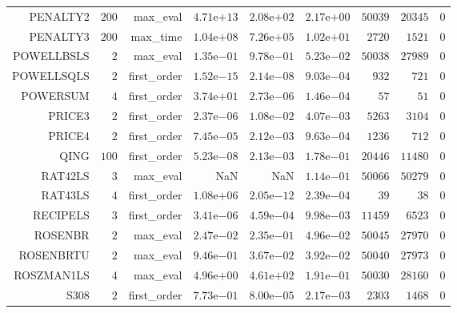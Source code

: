 \begin{longtable}{rrrrrrrrr}
PENALTY2 & \(   200\) & max\_eval & \( 4.71\)e\(+13\) & \( 2.08\)e\(+02\) & \( 2.17\)e\(+00\) & \( 50039\) & \( 20345\) & \(     0\) \\
PENALTY3 & \(   200\) & max\_time & \( 1.04\)e\(+08\) & \( 7.26\)e\(+05\) & \( 1.02\)e\(+01\) & \(  2720\) & \(  1521\) & \(     0\) \\
POWELLBSLS & \(     2\) & max\_eval & \( 1.35\)e\(-01\) & \( 9.78\)e\(-01\) & \( 5.23\)e\(-02\) & \( 50038\) & \( 27989\) & \(     0\) \\
POWELLSQLS & \(     2\) & first\_order & \( 1.52\)e\(-15\) & \( 2.14\)e\(-08\) & \( 9.03\)e\(-04\) & \(   932\) & \(   721\) & \(     0\) \\
POWERSUM & \(     4\) & first\_order & \( 3.74\)e\(+01\) & \( 2.73\)e\(-06\) & \( 1.46\)e\(-04\) & \(    57\) & \(    51\) & \(     0\) \\
PRICE3 & \(     2\) & first\_order & \( 2.37\)e\(-06\) & \( 1.08\)e\(-02\) & \( 4.07\)e\(-03\) & \(  5263\) & \(  3104\) & \(     0\) \\
PRICE4 & \(     2\) & first\_order & \( 7.45\)e\(-05\) & \( 2.12\)e\(-03\) & \( 9.63\)e\(-04\) & \(  1236\) & \(   712\) & \(     0\) \\
QING & \(   100\) & first\_order & \( 5.23\)e\(-08\) & \( 2.13\)e\(-03\) & \( 1.78\)e\(-01\) & \( 20446\) & \( 11480\) & \(     0\) \\
RAT42LS & \(     3\) & max\_eval &       NaN &       NaN & \( 1.14\)e\(-01\) & \( 50066\) & \( 50279\) & \(     0\) \\
RAT43LS & \(     4\) & first\_order & \( 1.08\)e\(+06\) & \( 2.05\)e\(-12\) & \( 2.39\)e\(-04\) & \(    39\) & \(    38\) & \(     0\) \\
RECIPELS & \(     3\) & first\_order & \( 3.41\)e\(-06\) & \( 4.59\)e\(-04\) & \( 9.98\)e\(-03\) & \( 11459\) & \(  6523\) & \(     0\) \\
ROSENBR & \(     2\) & max\_eval & \( 2.47\)e\(-02\) & \( 2.35\)e\(-01\) & \( 4.96\)e\(-02\) & \( 50045\) & \( 27970\) & \(     0\) \\
ROSENBRTU & \(     2\) & max\_eval & \( 9.46\)e\(-01\) & \( 3.67\)e\(-02\) & \( 3.92\)e\(-02\) & \( 50040\) & \( 27973\) & \(     0\) \\
ROSZMAN1LS & \(     4\) & max\_eval & \( 4.96\)e\(+00\) & \( 4.61\)e\(+02\) & \( 1.91\)e\(-01\) & \( 50030\) & \( 28160\) & \(     0\) \\
S308 & \(     2\) & first\_order & \( 7.73\)e\(-01\) & \( 8.00\)e\(-05\) & \( 2.17\)e\(-03\) & \(  2303\) & \(  1468\) & \(     0\) \\

\end{longtable}
